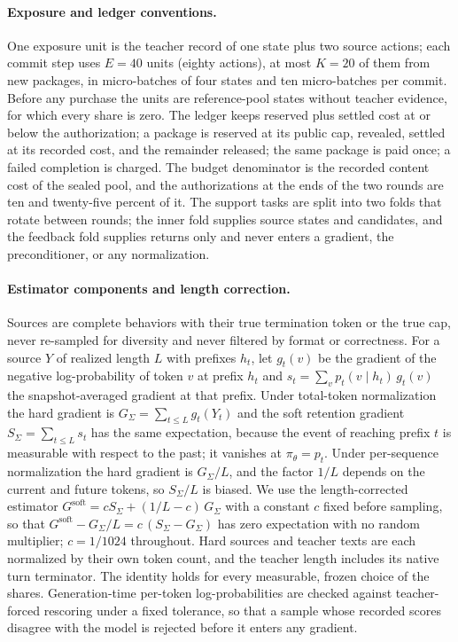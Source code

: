\paragraph{Exposure and ledger conventions.}
One exposure unit is the teacher record of one state plus two source
actions; each commit step uses $E=40$ units (eighty actions), at most
$K=20$ of them from new packages, in micro-batches of four states and
ten micro-batches per commit. Before any purchase the units are
reference-pool states without teacher evidence, for which every share
is zero. The ledger keeps reserved plus settled cost at or below the
authorization; a package is reserved at its public cap, revealed,
settled at its recorded cost, and the remainder released; the same
package is paid once; a failed completion is charged. The budget
denominator is the recorded content cost of the sealed pool, and the
authorizations at the ends of the two rounds are ten and twenty-five
percent of it. The support tasks are split into two folds that rotate
between rounds; the inner fold supplies source states and candidates,
and the feedback fold supplies returns only and never enters a
gradient, the preconditioner, or any normalization.

\paragraph{Estimator components and length correction.}
Sources are complete behaviors with their true termination token or
the true cap, never re-sampled for diversity and never filtered by
format or correctness. For a source $Y$ of realized length $L$ with
prefixes $h_t$, let $g_t(v)$ be the gradient of the negative
log-probability of token $v$ at prefix $h_t$ and
$s_t=\sum_v p_t(v\mid h_t)\,g_t(v)$ the snapshot-averaged gradient at
that prefix. Under total-token normalization the hard gradient is
$G_{\Sigma}=\sum_{t\le L}g_t(Y_t)$ and the soft retention gradient
$S_{\Sigma}=\sum_{t\le L}s_t$ has the same expectation, because the
event of reaching prefix $t$ is measurable with respect to the past;
it vanishes at $\pi_\theta=p_t$. Under per-sequence normalization the
hard gradient is $G_{\Sigma}/L$, and the factor $1/L$ depends on the
current and future tokens, so $S_{\Sigma}/L$ is biased. We use the
length-corrected estimator
$G^{\mathrm{soft}}=cS_{\Sigma}+(1/L-c)\,G_{\Sigma}$ with a constant
$c$ fixed before sampling, so that
$G^{\mathrm{soft}}-G_{\Sigma}/L=c\,(S_{\Sigma}-G_{\Sigma})$ has zero
expectation with no random multiplier; $c=1/1024$ throughout. Hard
sources and teacher texts are each normalized by their own token
count, and the teacher length includes its native turn terminator.
The identity holds for every measurable, frozen choice of the shares.
Generation-time per-token log-probabilities are checked against
teacher-forced rescoring under a fixed tolerance, so that a sample
whose recorded scores disagree with the model is rejected before it
enters any gradient.

